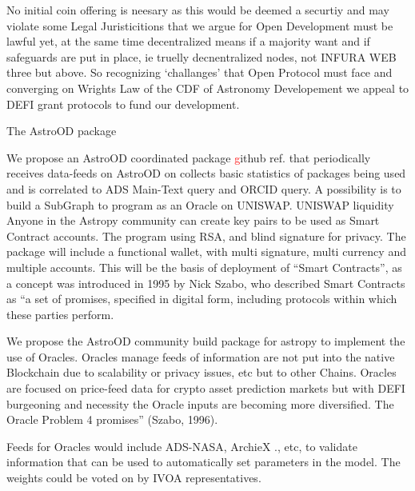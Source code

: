 \documentclass[final,5p,times,twocolumn,authoryear]{elsarticle}
\begin{document}
No initial coin offering is neesary as this would be deemed a securtiy and may violate some Legal Juristicitions that we argue for Open Development must be lawful yet, at the same time decentralized means if a majority want and if safeguards are put in place, ie truelly decnentralized nodes, not INFURA WEB three but above. So recognizing `challanges' that Open Protocol must face and converging on Wrights Law of the CDF of Astronomy Developement we appeal to DEFI grant protocols to fund our development. 


The AstroOD package 

We propose an AstroOD coordinated package \textcolor{red} github ref. that periodically receives data-feeds on AstroOD on collects basic statistics of packages being used and is correlated to ADS Main-Text query and ORCID query. A possibility is to build a SubGraph to program as an Oracle on UNISWAP. UNISWAP liquidity    Anyone in the Astropy community can create key pairs to be used as Smart Contract accounts. The program using RSA, and blind signature for privacy. The package will include a functional wallet, with multi signature, multi currency and multiple accounts. This will be the basis of deployment of “Smart Contracts”, as a concept was introduced in 1995 by Nick Szabo, who described Smart Contracts as “a set of promises,
specified in digital form, including protocols within which these parties perform.

We propose the AstroOD community build package for astropy to implement the use of Oracles. Oracles manage feeds of information are not put into the native Blockchain due to scalability or privacy issues, etc but to other Chains.  Oracles are focused on price-feed data for crypto asset prediction markets but with DEFI burgeoning and necessity the Oracle inputs are becoming more diversified.  The Oracle Problem 4 promises” (Szabo, 1996). 

Feeds for Oracles would include ADS-NASA, ArchieX ., etc,  to validate information that can be used to automatically set parameters in the model. The weights could be voted on by IVOA representatives.
\end{document}

